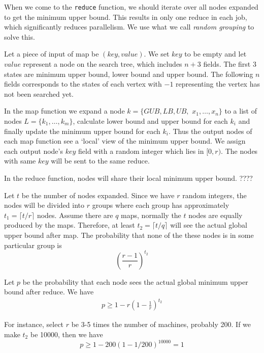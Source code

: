     When we come to the \texttt{reduce} function, we should iterate over all nodes expanded to get the minimum upper bound. This results in only one reduce in each job, which significantly {\color{red} reduces} parallelism. We use what we call \textit{random grouping} to solve this.

    Let a piece of input of map be $(key, value)$. We set $key$ to be empty and let $value$ represent a node on the search tree, which includes $n+3$ fields. The first $3$ states are minimum upper bound, lower bound and upper bound. The following $n$ fields corresponds to the states of each vertex with $-1$ representing the vertex has not been searched yet.

    In the map function we expand a node $k=\{GUB, LB, UB,$ $x_1, \dots, x_n\}$ to a list of nodes $L=\{k_1, \dots, k_m\}$, calculate lower bound and upper bound for each $k_i$ and finally update the minimum upper bound for each $k_i$. Thus the output nodes of each map function see a `local' view of the minimum upper bound. We assign each output node's $key$ field with a random integer which lies in $[0, r)$. The nodes with same $key$ will be sent to the same reduce.

    In the reduce function, nodes will share their local minimum upper bound. {\color{red}????}

    Let $t$ be the number of nodes expanded. Since we have $r$ random integers, the nodes will be divided into $r$ groups where each group has approximately $t_1=\lceil t/r \rceil$ nodes. Assume there are $q$ maps, normally the $t$ nodes are equally produced by the maps. Therefore, at least $t_2=\lceil t/q \rceil$ will see the actual global upper bound after map. The probability that none of the these nodes is in some particular group is
    \[
        \left(\frac{r-1}{r}\right)^{t_2}
    \]

    Let $p$ be the probability that each node sees the actual global minimum upper bound after reduce. We have
    \begin{align*}
        p \geq 1-r\left(1-\frac{1}{r}\right)^{t_2}
    \end{align*}

    For instance, select $r$ be 3-5 times the number of machines, probably 200. If we make $t_2$ be 10000, then we have
    \[p\geq 1-200(1-1/200)^{10000}=1\]
